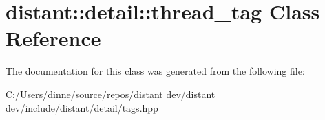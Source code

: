 \hypertarget{classdistant_1_1detail_1_1thread__tag}{}\section{distant\+:\+:detail\+:\+:thread\+\_\+tag Class Reference}
\label{classdistant_1_1detail_1_1thread__tag}


The documentation for this class was generated from the following file\+:\begin{DoxyCompactItemize}
\item 
C\+:/\+Users/dinne/source/repos/distant dev/distant dev/include/distant/detail/tags.\+hpp\end{DoxyCompactItemize}
